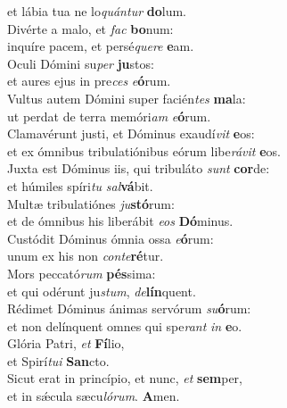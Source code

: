 \oddverse et lábia tua ne lo\textit{quán}\textit{tur} \textbf{do}lum.\\
\evenverse Divérte a malo, et \textit{fac} \textbf{bo}num:~\*\\
\evenverse inquíre pacem, et persé\textit{que}\textit{re} \textbf{e}am.\\
\oddverse Oculi Dómini su\textit{per} \textbf{ju}stos:~\*\\
\oddverse et aures ejus in pre\textit{ces} \textit{e}\textbf{ó}rum.\\
\evenverse Vultus autem Dómini super facién\textit{tes} \textbf{ma}la:~\*\\
\evenverse ut perdat de terra memóri\textit{am} \textit{e}\textbf{ó}rum.\\
\oddverse Clamavérunt justi, et Dóminus exaudí\textit{vit} \textbf{e}os:~\*\\
\oddverse et ex ómnibus tribulatiónibus eórum libe\textit{rá}\textit{vit} \textbf{e}os.\\
\evenverse Juxta est Dóminus iis, qui tribuláto \textit{sunt} \textbf{cor}de:~\*\\
\evenverse et húmiles spíri\textit{tu} \textit{sal}\textbf{vá}bit.\\
\oddverse Multæ tribulatiónes \textit{ju}\textbf{stó}rum:~\*\\
\oddverse et de ómnibus his liberábit \textit{e}\textit{os} \textbf{Dó}minus.\\
\evenverse Custódit Dóminus ómnia ossa \textit{e}\textbf{ó}rum:~\*\\
\evenverse unum ex his non \textit{con}\textit{te}\textbf{ré}tur.\\
\oddverse Mors peccató\textit{rum} \textbf{pés}sima:~\*\\
\oddverse et qui odérunt ju\textit{stum}, \textit{de}\textbf{lín}quent.\\
\evenverse Rédimet Dóminus ánimas servórum \textit{su}\textbf{ó}rum:~\*\\
\evenverse et non delínquent omnes qui spe\textit{rant} \textit{in} \textbf{e}o.\\
\oddverse Glória Patri, \textit{et} \textbf{Fí}lio,~\*\\
\oddverse et Spirí\textit{tu}\textit{i} \textbf{San}cto.\\
\evenverse Sicut erat in princípio, et nunc, \textit{et} \textbf{sem}per,~\*\\
\evenverse et in sǽcula sæcu\textit{ló}\textit{rum}. \textbf{A}men.\\
